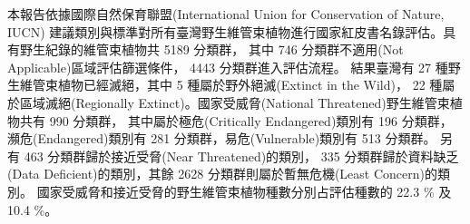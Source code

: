 
\noindent 本報告依據國際自然保育聯盟(International Union for Conservation of Nature, IUCN)
建議類別與標準對所有臺灣野生維管束植物進行國家紅皮書名錄評估。具有野生紀錄的維管束植物共 5189 分類群，
其中 746 分類群不適用(Not Applicable)區域評估篩選條件， 4443 分類群進入評估流程。
結果臺灣有 27 種野生維管束植物已經滅絕，其中 5 種屬於野外絕滅(Extinct in the Wild)，
22 種屬於區域滅絕(Regionally Extinct)。國家受威脅(National Threatened)野生維管束植物共有 990 分類群，
其中屬於極危(Critically Endangered)類別有 196 分類群，
瀕危(Endangered)類別有 281 分類群，易危(Vulnerable)類別有 513 分類群。
另有 463 分類群歸於接近受脅(Near Threatened)的類別，
335 分類群歸於資料缺乏(Data Deficient)的類別，其餘 2628 分類群則屬於暫無危機(Least Concern)的類別。
國家受威脅和接近受脅的野生維管束植物種數分別占評估種數的 22.3 \% 及 10.4 \%。 
